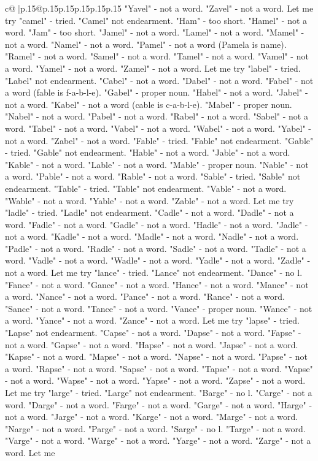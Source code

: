 \documentclass{article}
\begin{document}
{\begin{supertabular}{c@{$\;$}|p{.15\linewidth}@{}p{.15\linewidth}p{.15\linewidth}p{.15\linewidth}p{.15\linewidth}p{.15\linewidth}}
{{{"Yavel" {-} not a word. "Zavel" {-} not a word. Let me try "camel" {-} tried. "Camel" not endearment. "Ham" {-} too short. "Hamel" {-} not a word. "Jam" {-} too short. "Jamel" {-} not a word. "Lamel" {-} not a word. "Mamel" {-} not a word. "Namel" {-} not a word. "Pamel" {-} not a word (Pamela is name). "Ramel" {-} not a word. "Samel" {-} not a word. "Tamel" {-} not a word. "Vamel" {-} not a word. "Yamel" {-} not a word. "Zamel" {-} not a word. Let me try "label" {-} tried. "Label" not endearment. "Cabel" {-} not a word. "Dabel" {-} not a word. "Fabel" {-} not a word (fable is f{-}a{-}b{-}l{-}e). "Gabel" {-} proper noun. "Habel" {-} not a word. "Jabel" {-} not a word. "Kabel" {-} not a word (cable is c{-}a{-}b{-}l{-}e). "Mabel" {-} proper noun. "Nabel" {-} not a word. "Pabel" {-} not a word. "Rabel" {-} not a word. "Sabel" {-} not a word. "Tabel" {-} not a word. "Vabel" {-} not a word. "Wabel" {-} not a word. "Yabel" {-} not a word. "Zabel" {-} not a word. "Fable" {-} tried. "Fable" not endearment. "Gable" {-} tried. "Gable" not endearment. "Hable" {-} not a word. "Jable" {-} not a word. "Kable" {-} not a word. "Lable" {-} not a word. "Mable" {-} proper noun. "Nable" {-} not a word. "Pable" {-} not a word. "Rable" {-} not a word. "Sable" {-} tried. "Sable" not endearment. "Table" {-} tried. "Table" not endearment. "Vable" {-} not a word. "Wable" {-} not a word. "Yable" {-} not a word. "Zable" {-} not a word. Let me try "ladle" {-} tried. "Ladle" not endearment. "Cadle" {-} not a word. "Dadle" {-} not a word. "Fadle" {-} not a word. "Gadle" {-} not a word. "Hadle" {-} not a word. "Jadle" {-} not a word. "Kadle" {-} not a word. "Madle" {-} not a word. "Nadle" {-} not a word. "Padle" {-} not a word. "Radle" {-} not a word. "Sadle" {-} not a word. "Tadle" {-} not a word. "Vadle" {-} not a word. "Wadle" {-} not a word. "Yadle" {-} not a word. "Zadle" {-} not a word. Let me try "lance" {-} tried. "Lance" not endearment. "Dance" {-} no l. "Fance" {-} not a word. "Gance" {-} not a word. "Hance" {-} not a word. "Mance" {-} not a word. "Nance" {-} not a word. "Pance" {-} not a word. "Rance" {-} not a word. "Sance" {-} not a word. "Tance" {-} not a word. "Vance" {-} proper noun. "Wance" {-} not a word. "Yance" {-} not a word. "Zance" {-} not a word. Let me try "lapse" {-} tried. "Lapse" not endearment. "Capse" {-} not a word. "Dapse" {-} not a word. "Fapse" {-} not a word. "Gapse" {-} not a word. "Hapse" {-} not a word. "Japse" {-} not a word. "Kapse" {-} not a word. "Mapse" {-} not a word. "Napse" {-} not a word. "Papse" {-} not a word. "Rapse" {-} not a word. "Sapse" {-} not a word. "Tapse" {-} not a word. "Vapse" {-} not a word. "Wapse" {-} not a word. "Yapse" {-} not a word. "Zapse" {-} not a word. Let me try "large" {-} tried. "Large" not endearment. "Barge" {-} no l. "Carge" {-} not a word. "Darge" {-} not a word. "Farge" {-} not a word. "Garge" {-} not a word. "Harge" {-} not a word. "Jarge" {-} not a word. "Karge" {-} not a word. "Marge" {-} not a word. "Narge" {-} not a word. "Parge" {-} not a word. "Sarge" {-} no l. "Targe" {-} not a word. "Varge" {-} not a word. "Warge" {-} not a word. "Yarge" {-} not a word. "Zarge" {-} not a word. Let me }}}
\end{supertabular}}
\end{document}
